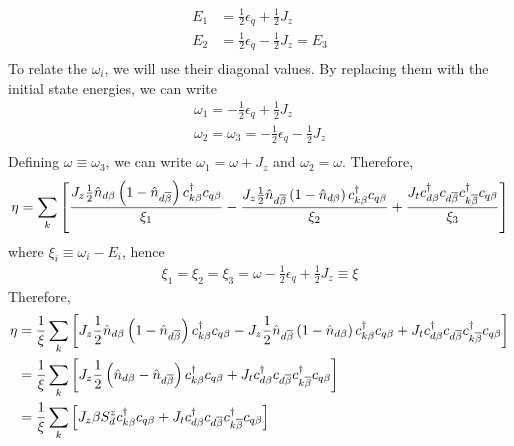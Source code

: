 \documentclass[12pt,twoside]{report}
\numberwithin{equation}{section}
\begin{document}
\begin{equation}\begin{aligned}
	E_1 &= \frac{1}{2}\epsilon_q + \frac{1}{2}J_z\\
	E_2 &= \frac{1}{2}\epsilon_q - \frac{1}{2}J_z = E_3\\
\end{aligned}\end{equation}
To relate the \(\omega_i\), we will use their diagonal values. By replacing them with the initial state energies, we can write
\begin{equation}\begin{aligned}
	\omega_1 = - \frac{1}{2}\epsilon_q + \frac{1}{2}J_z\\
	\omega_2 = \omega_3 = - \frac{1}{2}\epsilon_q - \frac{1}{2}J_z\\
\end{aligned}\end{equation}
Defining \(\omega \equiv \omega_3\), we can write \(\omega_1 = \omega + J_z\) and \(\omega_2 = \omega\). Therefore,
\begin{equation}\begin{aligned}
	\eta = \sum_k \left[\frac{ J_z \frac{1}{2}\hat n_{d\beta}\left( 1 - \hat n_{d\overline\beta} \right) c^\dagger_{k\beta}c_{q\beta}}{\xi_1} - \frac{J_z \frac{1}{2}\hat n_{d\overline\beta}\left( 1 - \hat n_{d\beta} \right) c^\dagger_{k\beta}c_{q\beta}}{\xi_2} + \frac{J_t  c^\dagger_{d\beta}c_{d\overline\beta} c^\dagger_{k\overline\beta}c_{q\beta}}{\xi_3}\right] 
\end{aligned}\end{equation}
where \(\xi_i \equiv \omega_i - E_i\), hence
\begin{equation}\begin{aligned}
	\xi_1 = \xi_2 = \xi_3 = \omega - \frac{1}{2}\epsilon_q + \frac{1}{2}J_z \equiv \xi
\end{aligned}\end{equation}
Therefore,
\begin{equation}\begin{aligned}
	\eta &= \frac{1}{\xi}\sum_k \left[ J_z \frac{1}{2}\hat n_{d\beta}\left( 1 - \hat n_{d\overline\beta} \right) c^\dagger_{k\beta}c_{q\beta} - J_z \frac{1}{2}\hat n_{d\overline\beta}\left( 1 - \hat n_{d\beta} \right) c^\dagger_{k\beta}c_{q\beta} + J_t  c^\dagger_{d\beta}c_{d\overline\beta} c^\dagger_{k\overline\beta}c_{q\beta}\right] \\
	     &= \frac{1}{\xi}\sum_k \left[ J_z \frac{1}{2}\left(\hat n_{d\beta} - \hat n_{d\overline\beta}\right) c^\dagger_{k\beta}c_{q\beta} + J_t  c^\dagger_{d\beta}c_{d\overline\beta} c^\dagger_{k\overline\beta}c_{q\beta}\right]\\
	     &= \frac{1}{\xi}\sum_k \left[ J_z \beta S_d^z c^\dagger_{k\beta}c_{q\beta} + J_t  c^\dagger_{d\beta}c_{d\overline\beta} c^\dagger_{k\overline\beta}c_{q\beta}\right]
\end{aligned}\end{equation}
\end{document}
